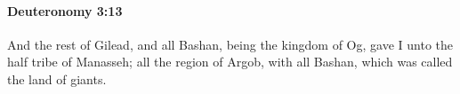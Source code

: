 
		\paragraph{Deuteronomy 3:13} %
			\label{DEUTERONOMY-3-13}

			And the rest of Gilead, and all Bashan, being the kingdom of Og, gave I unto the half tribe of Manasseh; all the region of Argob, with all Bashan, which was called the land of giants.


